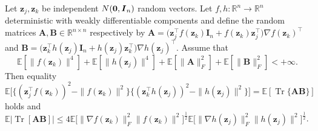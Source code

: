 \documentclass[11pt]{amsart}
\numberwithin{equation}{section}
\numberwithin{equation}{section}
\def\real{{\mathbb{R}}}
\def\R{{\real}}
\def\E{{\mathbb{E}}}
\DeclareMathOperator{\trace}{Tr}
\def\mathbold{\boldsymbol} %
\def\bA{\mathbold{A}}\def\calA{{\cal A}}\def\scrA{{\mathscr A}}\def\Ahat{\widehat{A}}\def\Atil{{\widetilde A}}
\def\bB{\mathbold{B}}\def\calB{{\cal B}}\def\scrB{{\mathscr B}}\def\Bhat{\widehat{B}}\def\Btil{{\widetilde B}}
\def\bI{\mathbold{I}}\def\hbI{{\widehat{\bI}}}\def\tbI{{\widetilde{\bI}}}
\def\bz{\mathbold{z}}\def\zhat{\widehat{z}}\def\ztil{\widetilde{z}}\def\zbar{{\overline z}}
\def\calB{{\mathscr B}}
\newcommand\pb[1]{{ #1 }}
\begin{document}
\begin{lemma}
    \label{lemma:f-g-z_j-z_k}
    Let $\bz_j,\bz_k$ be independent $N({\bf 0},\bI_n)$ random vectors.
    Let $f,h:\R^n\to\R^n$ deterministic with weakly differentiable
    components and define the random matrices $\bA,\bB\in\R^{n\times n}$
    respectively by
    $\bA = \bigl(
            \bz_j^\top f(\bz_k) \bI_n
            + f(\bz_k)\bz_j^\top
        \bigr)
        \nabla f(\bz_k)^\top
    $ and
    $\bB =
         \bigl(
         \bz_k^\top h(\bz_j) \bI_n
        + h(\bz_j) \bz_k^\top
        \bigr)
    \nabla h(\bz_j)^\top
    $.
    Assume that
    \begin{equation}
        \label{assumption-A-B-sobolev} 
    \E[\|f(\bz_k)\|^4]
    +
    \E[\|h(\bz_j)\|^4]
    +
    \E[\|\bA\|_F^2]
    +
    \E[\|\bB\|_F^2]
    < +\infty.
    \end{equation}
    Then equality
\begin{equation}
    \label{eq:equality-correlation-lemma}
\E\big[
    \big\{(\bz_j^{\pb{\top}} f(\bz_k))^2-\|f (\bz_k)\|^2 \big\}
    \big\{(\bz_k^{\pb{\top}} h(\bz_j))^2-\|h (\bz_j)\|^2 \big\}
    \big]
    =
    \E[
    \trace
    \{
        \bA \bB
    \}
    ]
    \end{equation}
holds and
$\E|\trace[\bA\bB]| \le
        4
        \E\bigl[\|\nabla f(\bz_k)\|_F^2\|f(\bz_k)\|^2\bigr]^{\frac12}
        \E\bigl[\|\nabla h(\bz_j)\|_F^2\|h(\bz_j)\|^2\bigr]^{\frac12}
$.
\end{lemma}
\end{document}
